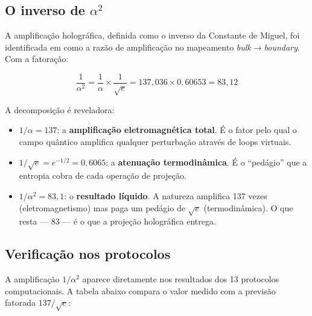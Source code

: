 \documentclass[12pt,a4paper,twoside]{article}
\newcommand{\alphaii}{\alpha^{2}}
\newcommand{\boundary}{\textit{boundary}}
\newcommand{\bulk}{\textit{bulk}}
\begin{document}
\subsection{O inverso de $\alphaii$}

A amplificação holográfica, definida como o inverso da Constante de Miguel, foi identificada em \cite{Miguel2026Fronteira} como a razão de amplificação no mapeamento \bulk$\to$\boundary. Com a fatoração:

\begin{equationbox}[title={Amplificação Decomposta}]
\begin{equation}
\boxed{\frac{1}{\alphaii} = \frac{1}{\alpha} \times \frac{1}{\sqrt{e}} = 137{,}036 \times 0{,}60653 = 83{,}12}
\label{eq:amplificacao}
\end{equation}
\end{equationbox}

A decomposição é reveladora:

\begin{itemize}[nosep]
\item $1/\alpha = 137$: a \textbf{amplificação eletromagnética total}. É o fator pelo qual o campo quântico amplifica qualquer perturbação através de loops virtuais.

\item $1/\sqrt{e} = e^{-1/2} = 0{,}6065$: a \textbf{atenuação termodinâmica}. É o ``pedágio'' que a entropia cobra de cada operação de projeção.

\item $1/\alphaii = 83{,}1$: o \textbf{resultado líquido}. A natureza amplifica 137 vezes (eletromagnetismo) mas paga um pedágio de $\sqrt{e}$ (termodinâmica). O que resta --- 83 --- é o que a projeção holográfica entrega.
\end{itemize}

\subsection{Verificação nos protocolos}

A amplificação $1/\alphaii$ aparece diretamente nos resultados dos 13 protocolos computacionais. A tabela abaixo compara o valor medido com a previsão fatorada $137/\sqrt{e}$:
\end{document}
